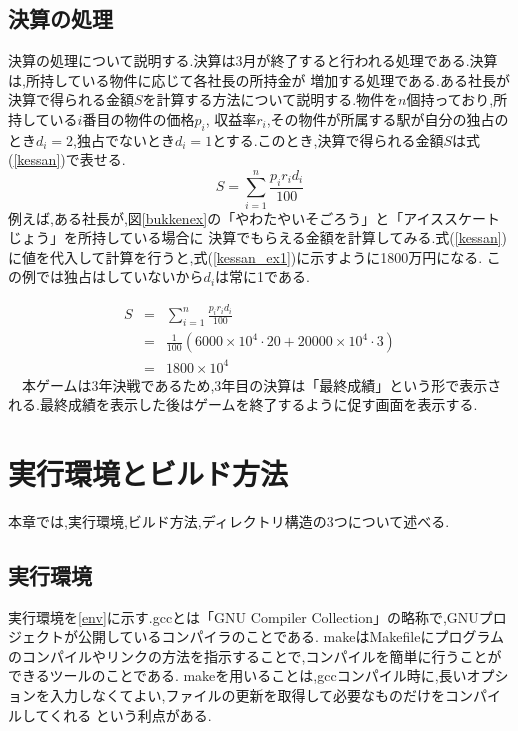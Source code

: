 \documentclass[a4j]{jarticle}
\begin{document}
      \subsection{決算の処理}
      決算の処理について説明する.決算は3月が終了すると行われる処理である.決算は,所持している物件に応じて各社長の所持金が
      増加する処理である.ある社長が決算で得られる金額$S$を計算する方法について説明する.物件を$n$個持っており,所持している$i$番目の物件の価格$p_i$,
      収益率$r_i$,その物件が所属する駅が自分の独占のとき$d_i=2$,独占でないとき$d_i=1$とする.このとき,決算で得られる金額$S$は式(\ref{kessan})で表せる.
      \begin{equation}
        S = \sum_{i=1}^{n} \frac{p_i r_i d_i}{100}
        \label{kessan}
      \end{equation}
      例えば,ある社長が,図\ref{bukkenex}の「やわたやいそごろう」と「アイススケートじょう」を所持している場合に
      決算でもらえる金額を計算してみる.式(\ref{kessan})に値を代入して計算を行うと,式(\ref{kessan_ex1})に示すように1800万円になる.
      この例では独占はしていないから$d_i$は常に1である.

      \begin{eqnarray}
        S &=& \sum_{i=1}^{n} \frac{p_i r_i d_i}{100} \\
          &=& \frac{1}{100} \left( 6000\times10^4 \cdot 20 + 20000\times10^4 \cdot 3 \right) \\
          &=& 1800 \times10^4
        \label{kessan_ex1}
      \end{eqnarray}    
      　本ゲームは3年決戦であるため,3年目の決算は「最終成績」という形で表示される.最終成績を表示した後はゲームを終了するように促す画面を表示する.
    
      \section{実行環境とビルド方法}
      本章では,実行環境,ビルド方法,ディレクトリ構造の3つについて述べる.
      \subsection{実行環境}
      実行環境を\ref{env}に示す.gccとは「GNU Compiler Collection」の略称で,GNUプロジェクトが公開しているコンパイラのことである.
      makeはMakefileにプログラムのコンパイルやリンクの方法を指示することで,コンパイルを簡単に行うことができるツールのことである.
      makeを用いることは,gccコンパイル時に,長いオプションを入力しなくてよい,ファイルの更新を取得して必要なものだけをコンパイルしてくれる
      という利点がある.
      
\end{document}
